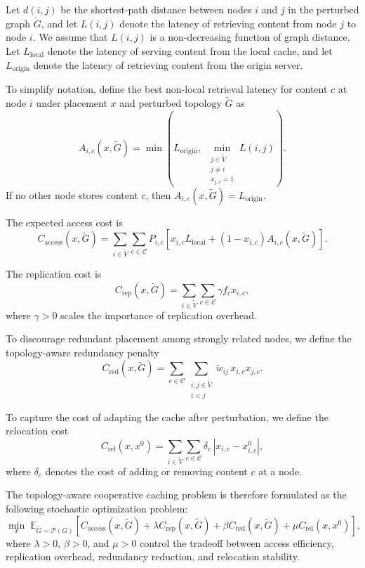 Let \(d(i,j)\) be the shortest-path distance between nodes \(i\) and \(j\) in the perturbed graph \(\tilde{G}\), and let \(L(i,j)\) denote the latency of retrieving content from node \(j\) to node \(i\). We assume that \(L(i,j)\) is a non-decreasing function of graph distance. Let \(L_{\text{local}}\) denote the latency of serving content from the local cache, and let \(L_{\text{origin}}\) denote the latency of retrieving content from the origin server.

To simplify notation, define the best non-local retrieval latency for content \(c\) at node \(i\) under placement \(x\) and perturbed topology \(\tilde{G}\) as
\[
A_{i,c}(x,\tilde{G})
=
\min\!\left(
L_{\text{origin}},
\;
\min_{\substack{j \in \tilde{V} \\ j \neq i \\ x_{j,c}=1}} L(i,j)
\right).
\]
If no other node stores content \(c\), then \(A_{i,c}(x,\tilde{G}) = L_{\text{origin}}\).

The expected access cost is
\[
C_{\text{access}}(x,\tilde{G})
=
\sum_{i \in \tilde{V}} \sum_{c \in \mathcal{C}}
P_{i,c}
\left[
x_{i,c} L_{\text{local}}
+
(1-x_{i,c}) A_{i,c}(x,\tilde{G})
\right].
\]

The replication cost is
\[
C_{\text{rep}}(x,\tilde{G})
=
\sum_{i \in \tilde{V}} \sum_{c \in \mathcal{C}}
\gamma f_c x_{i,c},
\]
where \(\gamma > 0\) scales the importance of replication overhead.

To discourage redundant placement among strongly related nodes, we define the topology-aware redundancy penalty
\[
C_{\text{red}}(x,\tilde{G})
=
\sum_{c \in \mathcal{C}}
\sum_{\substack{i,j \in \tilde{V} \\ i<j}}
\tilde{w}_{ij}\,x_{i,c}x_{j,c}.
\]

To capture the cost of adapting the cache after perturbation, we define the relocation cost
\[
C_{\text{rel}}(x,x^{0})
=
\sum_{i \in \tilde{V}} \sum_{c \in \mathcal{C}}
\delta_c \, |x_{i,c} - x^{0}_{i,c}|,
\]
where \(\delta_c\) denotes the cost of adding or removing content \(c\) at a node.

The topology-aware cooperative caching problem is therefore formulated as the following stochastic optimization problem:
\[
\min_{x}
\;
\mathbb{E}_{\tilde{G} \sim \mathcal{P}(G)}
\left[
C_{\text{access}}(x,\tilde{G})
+ \lambda C_{\text{rep}}(x,\tilde{G})
+ \beta C_{\text{red}}(x,\tilde{G})
+ \mu C_{\text{rel}}(x,x^{0})
\right],
\]
where \(\lambda > 0\), \(\beta > 0\), and \(\mu > 0\) control the tradeoff between access efficiency, replication overhead, redundancy reduction, and relocation stability.

